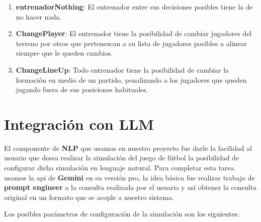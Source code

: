 \documentclass{article}
\begin{document}
\begin{enumerate}
      \item \textbf{entrenadorNothing}: El entrenador entre sus decisiones posibles tiene la de no hacer nada.
            
      \item \textbf{ChangePlayer}: El entrenador tiene la posibilidad de cambiar jugadores del terreno por otros que pertenezcan a su lista de jugadores posibles a alinear siempre que le queden cambios.
            
      \item \textbf{ChangeLineUp}: Todo entrenador tiene la posibilidad de cambiar la formación en medio de un partido, penalizando a los jugadores que queden jugando fuera de sus posiciones habituales.
            
\end{enumerate}


\section{Integración con LLM}

El componente de \textbf{NLP} que usamos en nuestro proyecto fue darle la facilidad al usuario que desea realizar la simulación del 
juego de fútbol la posibilidad de configurar dicha simulación en lenguaje natural. Para completar esta tarea usamos la api de \textbf{Gemini}
en su versión pro, la idea básica fue realizar trabajo de \textbf{prompt engineer} a la consulta realizada por el usuario y así obtener
la consulta original en un formato que se acople a nuestro sistema.

Los posibles parámetros de configuración de la simulación son los siguientes:
\end{document}
